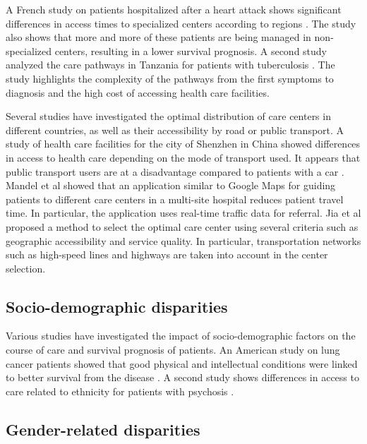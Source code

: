 A French study on patients hospitalized after a heart attack shows significant differences in access times to specialized centers according to regions \cite{com-ruelle_care_nodate}. The study also shows that more and more of these patients are being managed in non-specialized centers, resulting in a lower survival prognosis. A second study analyzed the care pathways in Tanzania for patients with tuberculosis \cite{mhalu_pathways_2019}. The study highlights the complexity of the pathways from the first symptoms to diagnosis and the high cost of accessing health care facilities.

Several studies have investigated the optimal distribution of care centers in different countries, as well as their accessibility by road or public transport. A study of health care facilities for the city of Shenzhen in China showed differences in access to health care depending on the mode of transport used. It appears that public transport users are at a disadvantage compared to patients with a car \cite{tao_spatial_2018}. Mandel et al \cite{mandel_optimizing_2018} showed that an application similar to Google Maps for guiding patients to different care centers in a multi-site hospital reduces patient travel time. In particular, the application uses real-time traffic data for referral. Jia et al \cite{jia_selecting_2014} proposed a method to select the optimal care center using several criteria such as geographic accessibility and service quality. In particular, transportation networks such as high-speed lines and highways are taken into account in the center selection.

\subsection*{Socio-demographic disparities}

Various studies have investigated the impact of socio-demographic factors on the course of care and survival prognosis of patients. An American study on lung cancer patients showed that good physical and intellectual conditions were linked to better survival from the disease \cite{pierzynski_socio-demographic_2018}. A second study shows differences in access to care related to ethnicity for patients with psychosis \cite{anderson_meta-analysis_2014}.

\subsection*{Gender-related disparities}

